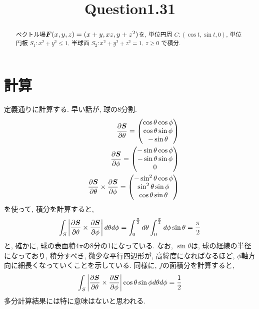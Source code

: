 \documentclass{jsarticle} \usepackage[dvipdfmx]{graphicx} \usepackage[dvipdfmx]{hyperref}
\title{Question1.31}
\newcommand*{\mbold}[1]{\mbox{\boldmath $#1$}}
\begin{document}
\maketitle

\begin{abstract}
  ベクトル場$\mbold{F}(x, y, z) = (x + y, xz, y + z^2)$を, 
  単位円周 $C : (\cos t, \sin t, 0)$, 単位円板 $S_1 : x^2 + y^2 \leq 1$, 半球面 $S_2 : x^2 + y^2 + z^2 = 1$, $z\geq 0$
  で積分. 
\end{abstract}

\section*{計算}
定義通りに計算する. 早い話が, 球の8分割. 
\begin{eqnarray}
  && \frac{\partial \mbold{S}}{\partial \theta} = 
  \begin{pmatrix}
    \cos\theta \cos\phi \\
    \cos\theta \sin\phi \\
    -\sin\theta\\
  \end{pmatrix}
  \nonumber \\
  && \frac{\partial \mbold{S}}{\partial \phi} = 
  \begin{pmatrix}
    -\sin\theta \cos\phi \\
    -\sin\theta \sin\phi \\
    0 \\
  \end{pmatrix}
  \nonumber \\
  && \frac{\partial \mbold{S}}{\partial \theta} \times \frac{\partial \mbold{S}}{\partial \phi} = 
  \begin{pmatrix}
    -\sin^2\theta \cos\phi \\
    \sin^2\theta \sin\phi \\
    \cos\theta \sin\theta \\
  \end{pmatrix}
\end{eqnarray}
を使って, 積分を計算すると, 
\begin{eqnarray}
  \int_S \left| \frac{\partial \mbold{S}}{\partial \theta} \times \frac{\partial \mbold{S}}{\partial \phi} \right|d\theta d\phi = 
  \int_0^{\frac{\pi}{2}}d\theta \int_0^{\frac{\pi}{2}}d\phi \sin\theta 
  = \frac{\pi}{2}
\end{eqnarray}
と, 確かに, 球の表面積$4\pi$の8分の1になっている. 
なお, $\sin\theta$は, 球の経線の半径になっており, 積分すべき, 微少な平行四辺形が, 高緯度になればなるほど, $\phi$軸方向に細長くなっていくことを示している. 
同様に, $f$の面積分を計算すると, 
\begin{eqnarray}
  \int_S \left| \frac{\partial \mbold{S}}{\partial \theta} \times \frac{\partial \mbold{S}}{\partial \phi} \right| \cos\theta \sin\phi d\theta d\phi 
  = \frac{1}{2}
\end{eqnarray}
多分計算結果には特に意味はないと思われる. 
\end{document}
